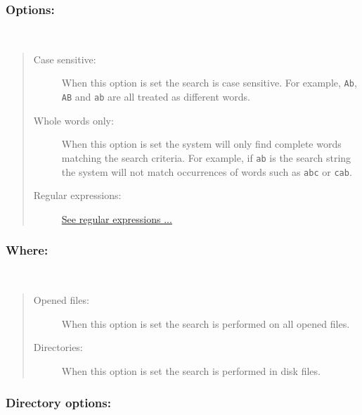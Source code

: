\subsubsection{Options:}\\

\begin{quote}
  \begin{footnotesize}
    \begin{description}
      \item[Case sensitive:]
        When this option is set the search is case sensitive.
        For example, \texttt{Ab}, \texttt{AB} and \texttt{ab}
        are all treated as different words.
      \item[Whole words only:]
        When this option is set the system will only find complete
        words matching the search criteria. For example, if
        \texttt{ab} is the search string the system will not match
        occurrences of words such as \texttt{abc} or \texttt{cab}.
      \item[Regular expressions:]
        \href{\#working\_regularexpressions}{See regular expressions ...}
    \end{description}
  \end{footnotesize}
\end{quote}

\subsubsection{Where:}\\

\begin{quote}
  \begin{footnotesize}
    \begin{description}
      \item[Opened files:]
        When this option is set the search is performed on all opened files.
      \item[Directories:]
        When this option is set the search is performed in disk files.
    \end{description}
  \end{footnotesize}
\end{quote}

\subsubsection{Directory options:}\\

